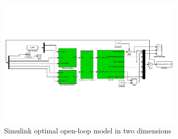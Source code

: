 \begin{figure}[ht!]
	\centering
 	\includegraphics[width = 0.78\textwidth]{figures/day4_ol/day4_ol_mdl}
 	\caption{Simulink optimal open-loop model in two dimensions}
 	\label{fig:simulink_day4_ol}
\end{figure}